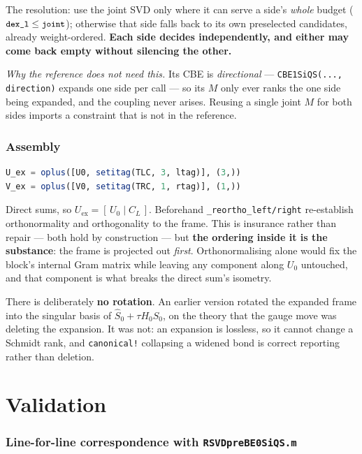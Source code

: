 \documentclass[11pt,a4paper]{article}
\newcommand{\code}[1]{\texttt{\small #1}}
\newcommand{\Uex}{U_{\mathrm{ex}}}
\begin{document}
The resolution: use the joint SVD only where it can serve a side's \emph{whole} budget
($\code{dex\_l}\le\code{joint}$); otherwise that side falls back to its own preselected
candidates, already weight-ordered. \textbf{Each side decides independently, and either may come
back empty without silencing the other.}

\emph{Why the reference does not need this.} Its CBE is \emph{directional} ---
\code{CBE1SiQS(..., direction)} expands one side per call --- so its $M$ only ever ranks the one
side being expanded, and the coupling never arises. Reusing a single joint $M$ for both sides
imports a constraint that is not in the reference.

\section{Assembly}

\begin{lstlisting}[language=Julia,firstnumber=786]
U_ex = oplus([U0, setitag(TLC, 3, ltag)], (3,))
V_ex = oplus([V0, setitag(TRC, 1, rtag)], (1,))
\end{lstlisting}

Direct sums, so $\Uex=[\,U_0\mid C_L\,]$. Beforehand \code{\_reortho\_left/right} re-establish
orthonormality and orthogonality to the frame. This is insurance rather than repair --- both
hold by construction --- but \textbf{the ordering inside it is the substance}: the frame is
projected out \emph{first}. Orthonormalising alone would fix the block's internal Gram matrix
while leaving any component along $U_0$ untouched, and that component is what breaks the direct
sum's isometry.

There is deliberately \textbf{no rotation}. An earlier version rotated the expanded frame into
the singular basis of $\hat S_0+\tau H_0\hat S_0$, on the theory that the gauge move was
deleting the expansion. It was not: an expansion is lossless, so it cannot change a Schmidt
rank, and \code{canonical!} collapsing a widened bond is correct reporting rather than deletion.

\part{Validation}
\label{part:valid}

\section{Line-for-line correspondence with \code{RSVDpreBE0SiQS.m}}
\end{document}
